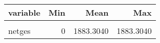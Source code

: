 \begin{table}
\centering
\begin{tabular}[t]{lrrr}
\toprule
variable & Min & Mean & Max\\
\midrule
\cellcolor{gray!10}{azges1} & \cellcolor{gray!10}{2} & \cellcolor{gray!10}{33.9312} & \cellcolor{gray!10}{33.9312}\\
netges & 0 & 1883.3040 & 1883.3040\\
\bottomrule
\end{tabular}
\end{table}
